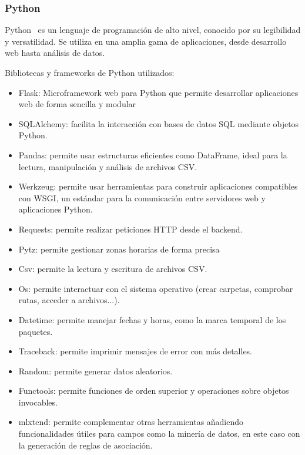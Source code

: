 \subsubsection{Python}
Python~\cite{Python} es un lenguaje de programación de alto nivel, conocido por su legibilidad y versatilidad. Se utiliza en una amplia gama de aplicaciones, desde desarrollo web hasta análisis de datos.



Bibliotecas y frameworks de Python utilizados:

\begin{itemize}
    \item {Flask}: Microframework web para Python que permite desarrollar aplicaciones web de forma sencilla y modular
    \item {SQLAlchemy}: facilita la interacción con bases de datos SQL mediante objetos Python.
    \item {Pandas}: permite usar estructuras eficientes como DataFrame, ideal para la lectura, manipulación y análisis de archivos CSV.
    \item {Werkzeug}: permite usar herramientas para construir aplicaciones compatibles con WSGI, un estándar para la comunicación entre servidores web y aplicaciones Python.
    \item {Requests}: permite realizar peticiones HTTP desde el backend.
    \item {Pytz}: permite gestionar zonas horarias de forma precisa
    \item {Csv}: permite la lectura y escritura de archivos CSV.
    \item {Os}: permite interactuar con el sistema operativo (crear carpetas, comprobar rutas, acceder a archivos...).
    \item {Datetime}: permite manejar fechas y horas, como la marca temporal de los paquetes.
    \item {Traceback}: permite imprimir mensajes de error con más detalles.
    \item {Random}: permite generar datos aleatorios.
    \item {Functools}: permite funciones de orden superior y operaciones sobre objetos invocables.
    \item {mlxtend}: permite complementar otras herramientas añadiendo funcionalidades útiles para campos como la minería de datos, en este caso con la generación de reglas de asociación.  
\end{itemize}



